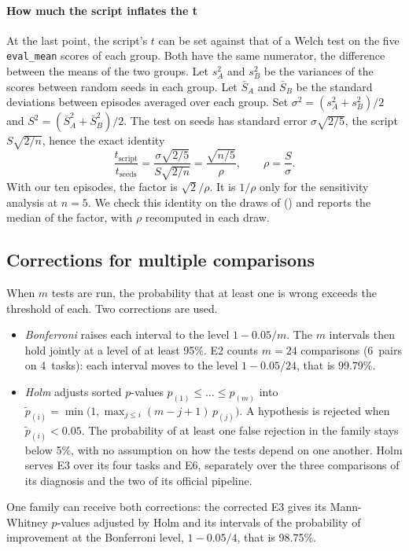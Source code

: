 \paragraph{How much the script inflates the t}
At the last point, the script's $t$ can be set against that of a Welch test on the five \texttt{eval\_mean}
scores of each group. Both have the same numerator, the difference between the means of the two groups. Let
$s_A^2$ and $s_B^2$ be the variances of the scores between random seeds in each group. Let $\bar S_A$ and
$\bar S_B$ be the standard deviations between episodes averaged over each group. Set
$\sigma^2=(s_A^2+s_B^2)/2$ and $S^2=(\bar S_A^2+\bar S_B^2)/2$. The test on seeds has standard error
$\sigma\sqrt{2/5}$, the script $S\sqrt{2/n}$, hence the exact identity
\begin{equation}\label{eq:facteur-b1}
  \frac{t_{\text{script}}}{t_{\text{seeds}}}=\frac{\sigma\sqrt{2/5}}{S\sqrt{2/n}}
  =\frac{\sqrt{n/5}}{\rho},\qquad \rho=\frac{S}{\sigma}.
\end{equation}
With our ten episodes, the factor is $\sqrt2/\rho$. It is $1/\rho$ only for the sensitivity analysis at $n=5$.
We check this identity on the draws of  () and
reports the median of the factor, with $\rho$ recomputed in each draw.

\subsection{Corrections for multiple comparisons}\label{sec:multiples}
When $m$ tests are run, the probability that at least one is wrong exceeds the threshold of each. Two
corrections are used.
\begin{itemize}
  \item \emph{Bonferroni} \parencite{dunn1961multiple} raises each interval to the level $1-0.05/m$. The $m$
    intervals then hold jointly at a level of at least 95\%. E2 counts $m=24$ comparisons (6~pairs on
    4~tasks): each interval moves to the level $1-0.05/24$, that is 99.79\%.
  \item \emph{Holm} \parencite{holm1979simple} adjusts sorted $p$-values $p_{(1)}\le\dots\le p_{(m)}$ into
    $\tilde p_{(i)}=\min\bigl(1,\max_{j\le i}(m-j+1)\,p_{(j)}\bigr)$. A hypothesis is rejected when
    $\tilde p_{(i)}<0.05$. The probability of at least one false rejection in the family stays below 5\%, with
    no assumption on how the tests depend on one another. Holm serves E3 over its four tasks and
    E6, separately over the three comparisons of its diagnosis and the two of its official pipeline.
\end{itemize}
One family can receive both corrections: the corrected E3 gives its Mann-Whitney $p$-values adjusted by Holm
and its intervals of the probability of improvement at the Bonferroni level, $1-0.05/4$, that is 98.75\%.

